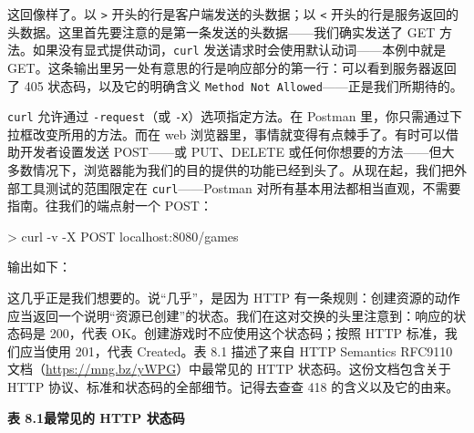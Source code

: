 这回像样了。以 \texttt{>} 开头的行是客户端发送的头数据；以 \texttt{<} 开头的行是服务返回的头数据。这里首先要注意的是第一条发送的头数据——我们确实发送了 GET 方法。如果没有显式提供动词，\texttt{curl} 发送请求时会使用默认动词——本例中就是 GET。这条输出里另一处有意思的行是响应部分的第一行：可以看到服务器返回了 405 状态码，以及它的明确含义 \texttt{Method Not Allowed}——正是我们所期待的。

\texttt{curl} 允许通过 \texttt{-\-request}（或 \texttt{-X}）选项指定方法。在 Postman 里，你只需通过下拉框改变所用的方法。而在 web 浏览器里，事情就变得有点棘手了。有时可以借助开发者设置发送 POST——或 PUT、DELETE 或任何你想要的方法——但大多数情况下，浏览器能为我们的目的提供的功能已经到头了。从现在起，我们把外部工具测试的范围限定在 \texttt{curl}——Postman 对所有基本用法都相当直观，不需要指南。往我们的端点射一个 POST：

\begin{shellcode}[]
> curl -v -X POST localhost:8080/games
\end{shellcode}

输出如下：


这几乎正是我们想要的。说``几乎''，是因为 HTTP 有一条规则：创建资源的动作应当返回一个说明``资源已创建''的状态。我们在这对交换的头里注意到：响应的状态码是 200，代表 OK。创建游戏时不应使用这个状态码；按照 HTTP 标准，我们应当使用 201，代表 Created。表 8.1 描述了来自 HTTP Semantics RFC9110 文档（\url{https://mng.bz/yWPG}）中最常见的 HTTP 状态码。这份文档包含关于 HTTP 协议、标准和状态码的全部细节。记得去查查 418 的含义以及它的由来。

\Needspace{0.46\textheight}
\medskip
\noindent\textbf{表 8.1\quad 最常见的 HTTP 状态码}

